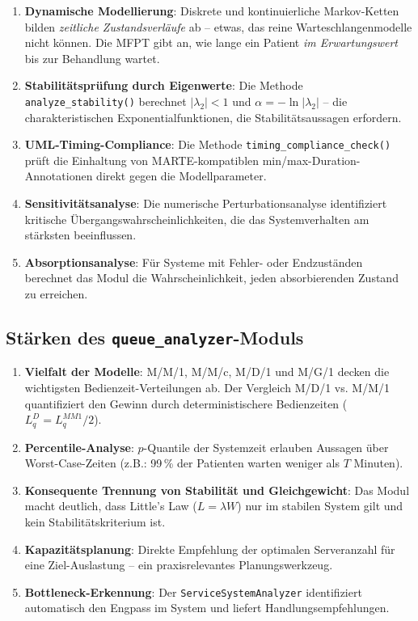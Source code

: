 ﻿\documentclass[a4paper,12pt]{report}
\theoremstyle{definition}
\begin{document}
\begin{enumerate}
	\item[-] \textbf{Dynamische Modellierung}: Diskrete und kontinuierliche
	Markov-Ketten bilden \emph{zeitliche Zustandsverläufe} ab -- etwas,
	das reine Warteschlangenmodelle nicht können. Die MFPT gibt an, wie
	lange ein Patient \emph{im Erwartungswert} bis zur Behandlung wartet.
	\item[-] \textbf{Stabilitätsprüfung durch Eigenwerte}: Die Methode
	\texttt{analyze\_stability()} berechnet $|\lambda_2| < 1$ und
	$\alpha = -\ln|\lambda_2|$ -- die charakteristischen Exponentialfunktionen,
	die Stabilitätsaussagen erfordern.
	\item[-] \textbf{UML-Timing-Compliance}: Die Methode
	\texttt{timing\_compliance\_check()} prüft die Einhaltung von
	MARTE-kompatiblen min/max-Duration-Annotationen direkt gegen die
	Modellparameter.
	\item[-] \textbf{Sensitivitätsanalyse}: Die numerische Perturbationsanalyse
	identifiziert kritische Übergangswahrscheinlichkeiten, die das
	Systemverhalten am stärksten beeinflussen.
	\item[-] \textbf{Absorptionsanalyse}: Für Systeme mit Fehler- oder
	Endzuständen berechnet das Modul die Wahrscheinlichkeit, jeden
	absorbierenden Zustand zu erreichen.
\end{enumerate}

\subsection{Stärken des \texttt{queue\_analyzer}-Moduls}

\begin{enumerate}
	\item[-] \textbf{Vielfalt der Modelle}: M/M/1, M/M/c, M/D/1 und M/G/1
	decken die wichtigsten Bedienzeit-Verteilungen ab. Der Vergleich
	M/D/1 vs. M/M/1 quantifiziert den Gewinn durch deterministischere
	Bedienzeiten ($L_q^D = L_q^{MM1}/2$).
	\item[-] \textbf{Percentile-Analyse}: $p$-Quantile der Systemzeit erlauben
	Aussagen über Worst-Case-Zeiten (z.B.: 99\,\% der Patienten warten
	weniger als $T$ Minuten).
	\item[-] \textbf{Konsequente Trennung von Stabilität und Gleichgewicht}:
	Das Modul macht deutlich, dass Little's Law ($L = \lambda W$) nur im
	stabilen System gilt und kein Stabilitätskriterium ist.
	\item[-] \textbf{Kapazitätsplanung}: Direkte Empfehlung der optimalen
	Serveranzahl für eine Ziel-Auslastung -- ein praxisrelevantes
	Planungswerkzeug.
	\item[-] \textbf{Bottleneck-Erkennung}: Der \texttt{ServiceSystemAnalyzer}
	identifiziert automatisch den Engpass im System und liefert
	Handlungsempfehlungen.
\end{enumerate}
\end{document}
